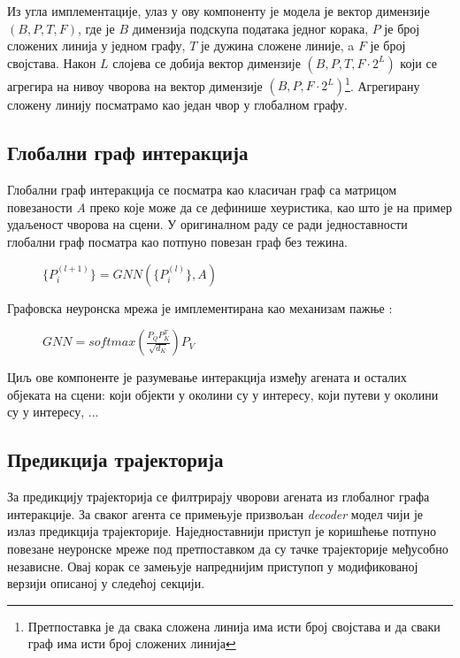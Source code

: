\documentclass[11pt,oneside]{memoir}
\begin{document}
Из угла имплементације, улаз у ову компоненту је модела је вектор димензије $(B, P, T, F)$, где је $B$ димензија подскупа података једног корака, 
$P$ је број сложених линија у једном графу, $T$ је дужина сложене линије, a $F$ је број својстава. Након $L$ слојева се добија вектор димензије 
$(B, P, T, F \cdot 2^{L})$ који се агрегира на нивоу чворова на вектор димензије
$(B, P, F \cdot 2^{L})$\footnote{Претпоставка је да свака сложена линија има исти број својстава и да сваки граф има исти број сложених линија}. 
Агрегирану сложену линију посматрамо као један чвор у глобалном графу.
         
\subsection{Глобални граф интеракција}

Глобални граф интеракција се посматра као класичан граф са матрицом повезаности \textit{A} преко које може да се дефинише хеуристика, као што је на пример удаљеност
чворова на сцени. У оригиналном раду се ради једноставности глобални граф посматра као потпуно повезан граф без тежина. \cite{vectornet}

\begin{figure}[H]
  \centering
  $\{P^{(l+1)}_{i}\} = GNN(\{P^{(l)}_{i}\}, A)$
\end{figure}

\noindent Графовска неуронска мрежа је имплементирана као механизам пажње \cite{attention_is_all_you_need}:

\begin{figure}[H]
  \centering
  $GNN = softmax(\frac{P_{Q}P^{T}_{K}}{\sqrt{d_{K}}})P_{V}$
\end{figure}

Циљ ове компоненте је разумевање интеракција између агената и осталих објеката на сцени: који објекти у околини су у интересу, који путеви у околини су
у интересу, ...

\subsection{Предикција трајекторија}

За предикцију трајекторија се филтрирају чворови агената из глобалног графа интеракције. За сваког агента се примењује призвољан \textit{decoder} модел
чији је излаз предикција трајекторије. Наједноставнији приступ је коришћење потпуно повезане неуронске мреже под претпоставком да су 
тачке трајекторије међусобно независне. Овај корак се замењује напреднијим приступоп у модификованој верзији описаној у следећој секцији.
\end{document}
